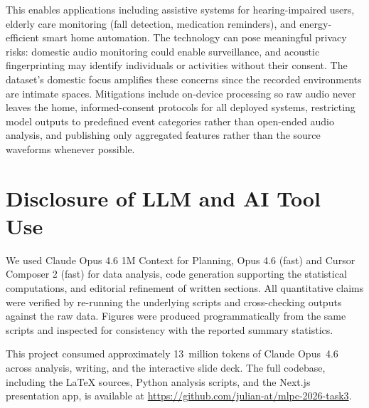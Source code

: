 \documentclass{article}
\begin{document}
This enables applications including assistive systems for hearing-impaired users, elderly care monitoring (fall detection, medication reminders), and energy-efficient smart home automation. The technology can pose meaningful privacy risks: domestic audio monitoring could enable surveillance, and acoustic fingerprinting may identify individuals or activities without their consent. The dataset's domestic focus amplifies these concerns since the recorded environments are intimate spaces. Mitigations include on-device processing so raw audio never leaves the home, informed-consent protocols for all deployed systems, restricting model outputs to predefined event categories rather than open-ended audio analysis, and publishing only aggregated features rather than the source waveforms whenever possible.

\section{Disclosure of LLM and AI Tool Use}

We used Claude Opus 4.6 1M Context for Planning, Opus 4.6 (fast) and Cursor Composer 2 (fast) for data analysis, code generation supporting the statistical computations, and editorial refinement of written sections. All quantitative claims were verified by re-running the underlying scripts and cross-checking outputs against the raw data. Figures were produced programmatically from the same scripts and inspected for consistency with the reported summary statistics.

This project consumed approximately 13~million tokens of Claude Opus~4.6 across analysis, writing, and the
interactive slide deck. The full codebase, including the LaTeX sources, Python
analysis scripts, and the Next.js presentation app, is available at
\url{https://github.com/julian-at/mlpc-2026-task3}.
  
\end{document}
